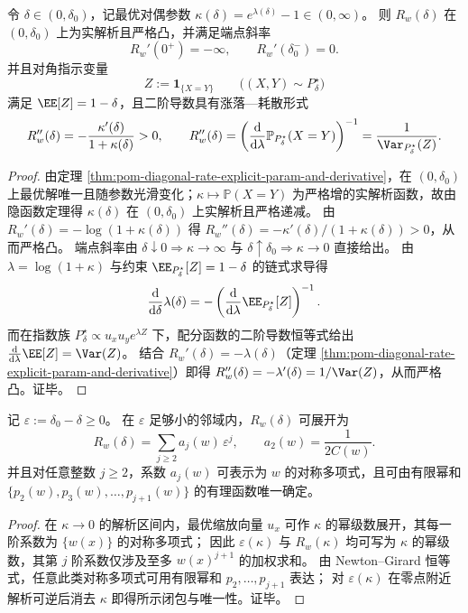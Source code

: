 \begin{proposition}\label{prop:pom-diagonal-rate-analytic-strict-convexity-curvature}
令 \(\delta\in(0,\delta_0)\)，记最优对偶参数 \(\kappa(\delta)=e^{\lambda(\delta)}-1\in(0,\infty)\)。
则 \(R_w(\delta)\) 在 \((0,\delta_0)\) 上为实解析且严格凸，并满足端点斜率
\[
R_w'(0^+)=-\infty,\qquad R_w'(\delta_0^-)=0.
\]
并且对角指示变量
\[
Z:=\mathbf 1_{\{X=Y\}}\qquad\bigl((X,Y)\sim P^\star_\delta\bigr)
\]
满足 \(\EE[Z]=1-\delta\)，且二阶导数具有涨落—耗散形式
\[
R_w''(\delta)=-\frac{\kappa'(\delta)}{1+\kappa(\delta)}>0,
\qquad
R_w''(\delta)=\left(\frac{\mathrm d}{\mathrm d\lambda}\mathbb P_{P^\star_\delta}(X=Y)\right)^{-1}
=\frac{1}{\Var_{P^\star_\delta}(Z)}.
\]
\end{proposition}
\begin{proof}
由定理 \ref{thm:pom-diagonal-rate-explicit-param-and-derivative}，在 \((0,\delta_0)\) 上最优解唯一且随参数光滑变化；\(\kappa\mapsto \mathbb P(X=Y)\) 为严格增的实解析函数，故由隐函数定理得 \(\kappa(\delta)\) 在 \((0,\delta_0)\) 上实解析且严格递减。
由
\(
R_w'(\delta)=-\log(1+\kappa(\delta))
\)
得
\(
R_w''(\delta)=-\kappa'(\delta)/(1+\kappa(\delta))>0
\)，从而严格凸。
端点斜率由 \(\delta\downarrow 0\Rightarrow \kappa\to\infty\) 与 \(\delta\uparrow\delta_0\Rightarrow \kappa\to 0\) 直接给出。
由 \(\lambda=\log(1+\kappa)\) 与约束 \(\EE_{P^\star_\delta}[Z]=1-\delta\) 的链式求导得
\[
\frac{\mathrm d}{\mathrm d\delta}\lambda(\delta)
=-\left(\frac{\mathrm d}{\mathrm d\lambda}\EE_{P^\star_\delta}[Z]\right)^{-1}.
\]
而在指数族 \(P^\star_\delta\propto u_xu_y e^{\lambda Z}\) 下，配分函数的二阶导数恒等式给出
\(
\frac{\mathrm d}{\mathrm d\lambda}\EE[Z]=\Var(Z)
\)。
结合 \(R_w'(\delta)=-\lambda(\delta)\)（定理 \ref{thm:pom-diagonal-rate-explicit-param-and-derivative}）即得
\(
R_w''(\delta)=-\lambda'(\delta)=1/\Var(Z)
\)，从而严格凸。证毕。
\end{proof}

\begin{proposition}\label{prop:pom-diagonal-rate-finite-moment-closure}
记 \(\varepsilon:=\delta_0-\delta\ge 0\)。
在 \(\varepsilon\) 足够小的邻域内，\(R_w(\delta)\) 可展开为
\[
R_w(\delta)=\sum_{j\ge 2} a_j(w)\,\varepsilon^j,
\qquad
a_2(w)=\frac{1}{2C(w)}.
\]
并且对任意整数 \(j\ge 2\)，系数 \(a_j(w)\) 可表示为 \(w\) 的对称多项式，且可由有限幂和 \(\{p_2(w),p_3(w),\dots,p_{j+1}(w)\}\) 的有理函数唯一确定。
\end{proposition}
\begin{proof}
在 \(\kappa\to 0\) 的解析区间内，最优缩放向量 \(u_x\) 可作 \(\kappa\) 的幂级数展开，其每一阶系数为 \(\{w(x)\}\) 的对称多项式；
因此 \(\varepsilon(\kappa)\) 与 \(R_w(\kappa)\) 均可写为 \(\kappa\) 的幂级数，其第 \(j\) 阶系数仅涉及至多 \(w(x)^{j+1}\) 的加权求和。
由 Newton--Girard 恒等式，任意此类对称多项式可用有限幂和 \(p_2,\dots,p_{j+1}\) 表达；
对 \(\varepsilon(\kappa)\) 在零点附近解析可逆后消去 \(\kappa\) 即得所示闭包与唯一性。证毕。
\end{proof}

